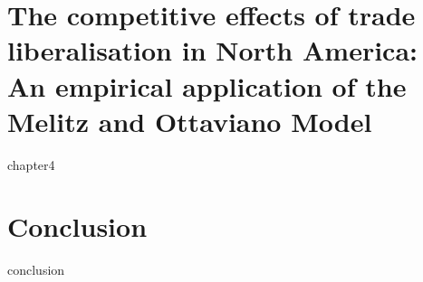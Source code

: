 \documentclass[oneside,12pt,a4paper]{Classes/CUEDthesisPSnPDF}
\begin{document}
\chapter{The competitive effects of trade liberalisation in North America: An empirical application of the Melitz and Ottaviano Model}  
{chapter4} 

\chapter{Conclusion} %
{conclusion}

\begin{spacing}{1.5}


\end{spacing}
\end{document}
